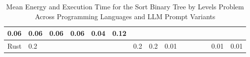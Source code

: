 \begin{table}[]
{\begin{tabular}{|l|lllllll|lllllll|}
  \multicolumn{1}{l|}{{\color[HTML]{666666} 0.06}} &
  \multicolumn{1}{l|}{{\color[HTML]{666666} 0.06}} &
  \multicolumn{1}{l|}{{\color[HTML]{666666} 0.06}} &
  \multicolumn{1}{l|}{{\color[HTML]{666666} 0.06}} &
  \multicolumn{1}{l|}{{\color[HTML]{666666} 0.04}} &
  {\color[HTML]{666666} 0.12} \\ \hline
{\color[HTML]{666666} Rust} &
  \multicolumn{1}{l|}{{\color[HTML]{666666} 0.2}} &
  \multicolumn{1}{l|}{{\color[HTML]{666666} }} &
  \multicolumn{1}{l|}{{\color[HTML]{666666} }} &
  \multicolumn{1}{l|}{{\color[HTML]{666666} }} &
  \multicolumn{1}{l|}{{\color[HTML]{666666} }} &
  \multicolumn{1}{l|}{{\color[HTML]{666666} 0.2}} &
  {\color[HTML]{666666} 0.2} &
  \multicolumn{1}{l|}{{\color[HTML]{666666} 0.01}} &
  \multicolumn{1}{l|}{{\color[HTML]{666666} }} &
  \multicolumn{1}{l|}{{\color[HTML]{666666} }} &
  \multicolumn{1}{l|}{{\color[HTML]{666666} }} &
  \multicolumn{1}{l|}{{\color[HTML]{666666} }} &
  \multicolumn{1}{l|}{{\color[HTML]{666666} 0.01}} &
  {\color[HTML]{666666} 0.01} \\ \hline
\end{tabular}%
}
\centering
\caption{Mean Energy and Execution Time for the Sort Binary Tree by Levels Problem Across Programming Languages and LLM Prompt Variants}
\end{table}